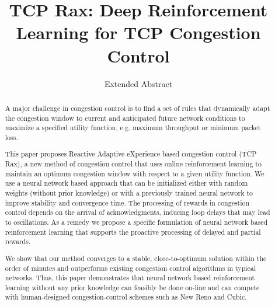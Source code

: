 \documentclass[sigconf]{acmart}
\begin{document}
\title{TCP Rax: Deep Reinforcement Learning for TCP Congestion Control}
\subtitle{Extended Abstract}

%
%


\begin{abstract}

A major challenge in congestion control is to find a set of rules that dynamically adapt the congestion window to current and anticipated future network conditions to maximize a specified utility function, e.g. maximum throughput or minimum packet loss. 

This paper proposes Reactive Adaptive eXperience based congestion control (TCP Rax), a new method of congestion control that uses online reinforcement learning to maintain an optimum congestion window with respect to a given utility function. We use a neural network based approach that can be initialized either with random weights (without prior knowledge) or with a previously trained neural network to improve stability and convergence time. The processing of rewards in congestion control depends on the arrival of acknowledgments, inducing loop delays that may lead to oscillations. As a remedy we propose a specific formulation of neural network based reinforcement learning that supports the proactive processing of delayed and partial rewards. 

We show that our method converges to a stable, close-to-optimum solution within the order of minutes and outperforms existing congestion control algorithms in typical networks. Thus, this paper demonstrates that neural network based reinforcement learning without any prior knowledge can feasibly be done on-line and can compete with human-designed congestion-control schemes such as New Reno and Cubic.

\end{abstract}
\end{document}
